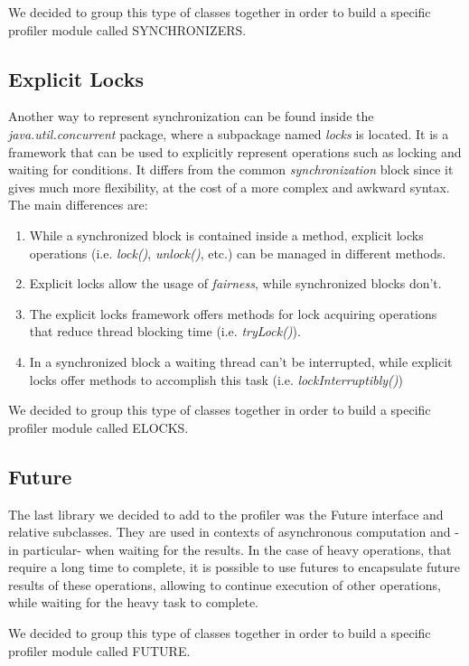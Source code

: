 \documentclass[]{usiinfthesis}
\begin{document}
\noindent
We decided to group this type of classes together in order to build a specific profiler module called SYNCHRONIZERS.


\subsection{Explicit Locks}
Another way to represent synchronization can be found inside the \textit{java.util.concurrent} package, where a subpackage named \textit{locks} is located. It is a framework that can be used to explicitly represent operations such as locking and waiting for conditions. It differs from the common \textit{synchronization} block since it gives much more flexibility, at the cost of a more complex and awkward syntax. The main differences are:
\begin{enumerate}
    \item While a synchronized block is contained inside a method, explicit locks operations (i.e. \textit{lock()}, \textit{unlock()}, etc.) can be managed in different methods.
    \item Explicit locks allow the usage of \textit{fairness}, while synchronized blocks don't.
    \item The explicit locks framework offers methods for lock acquiring operations that reduce thread blocking time (i.e. \textit{tryLock()}).
    \item In a synchronized block a waiting thread can't be interrupted, while explicit locks offer methods to accomplish this task (i.e. \textit{lockInterruptibly()})
\end{enumerate}

\noindent
We decided to group this type of classes together in order to build a specific profiler module called ELOCKS.

\subsection{Future}
The last library we decided to add to the profiler was the Future interface and relative subclasses. They are used in contexts of asynchronous computation and -in particular- when waiting for the results. In the case of heavy operations, that require a long time to complete, it is possible to use futures to encapsulate future results of these operations, allowing to continue execution of other operations, while waiting for the heavy task to complete.

\noindent
We decided to group this type of classes together in order to build a specific profiler module called FUTURE.
\end{document}
